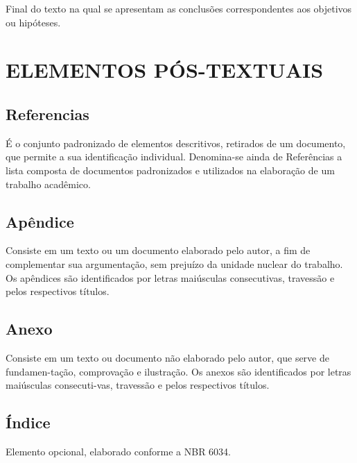 Final do texto na qual se apresentam as conclusões correspondentes aos objetivos ou hipóteses.

\section{ELEMENTOS PÓS-TEXTUAIS}

\subsection{Referencias}

É o conjunto padronizado de elementos descritivos, retirados de
um documento, que permite a sua identificação individual. Denomina-se ainda de Referências a lista composta de documentos padronizados e utilizados na elaboração de um trabalho acadêmico.

\subsection{Apêndice}

Consiste em um texto ou um documento elaborado pelo autor, a fim
de complementar sua argumentação, sem prejuízo da unidade nuclear do trabalho. Os apêndices são identificados por letras maiúsculas consecutivas, travessão e pelos respectivos títulos.

\subsection{Anexo}

Consiste em um texto ou documento não elaborado pelo autor, que
serve de fundamen-tação, comprovação e ilustração. Os anexos são identificados por letras maiúsculas consecuti-vas, travessão e pelos respectivos títulos.

\subsection{Índice}

Elemento opcional, elaborado conforme a NBR 6034.

